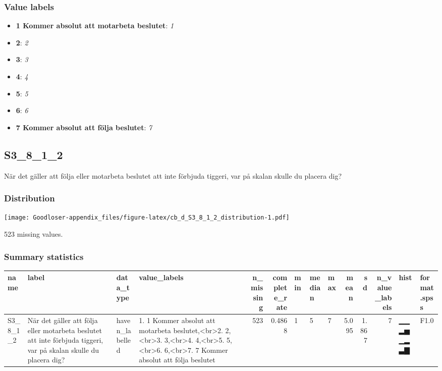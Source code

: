 \documentclass[
]{book}
\providecommand{\tightlist}{%
  \setlength{\itemsep}{0pt}\setlength{\parskip}{0pt}}
\begin{document}
\hypertarget{S3_8_1_1_labels}{%
\subsubsection{Value labels}\label{S3_8_1_1_labels}}

\begin{itemize}
\tightlist
\item
  \textbf{1 Kommer absolut att motarbeta beslutet}: \emph{1}
\item
  \textbf{2}: \emph{2}
\item
  \textbf{3}: \emph{3}
\item
  \textbf{4}: \emph{4}
\item
  \textbf{5}: \emph{5}
\item
  \textbf{6}: \emph{6}
\item
  \textbf{7 Kommer absolut att följa beslutet}: \emph{7}
\end{itemize}

\hypertarget{S3_8_1_2}{%
\subsection{S3\_8\_1\_2}\label{S3_8_1_2}}

När det gäller att följa eller motarbeta beslutet att inte förbjuda tiggeri, var på skalan skulle du placera dig?

\hypertarget{S3_8_1_2_distribution}{%
\subsubsection{Distribution}\label{S3_8_1_2_distribution}}

\texttt{[image: Goodloser-appendix\_files/figure-latex/cb\_d\_S3\_8\_1\_2\_distribution-1.pdf]}

523 missing values.

\hypertarget{S3_8_1_2_summary}{%
\subsubsection{Summary statistics}\label{S3_8_1_2_summary}}

\begin{tabular}{l|l|l|l|r|r|l|l|l|r|r|r|l|l}
\hline
name & label & data_type & value_labels & n_missing & complete_rate & min & median & max & mean & sd & n_value_labels & hist & format.spss\\
\hline
S3_8_1_2 & När det gäller att följa eller motarbeta beslutet att inte förbjuda tiggeri, var på skalan skulle du placera dig? & haven_labelled & 1. 1 Kommer absolut att motarbeta beslutet,<br>2. 2,<br>3. 3,<br>4. 4,<br>5. 5,<br>6. 6,<br>7. 7 Kommer absolut att följa beslutet & 523 & 0.4868 & 1 & 5 & 7 & 5.095 & 1.867 & 7 & ▁▁▂▅▁▂▃▇ & F1.0\\
\hline
\end{tabular}
\end{document}

